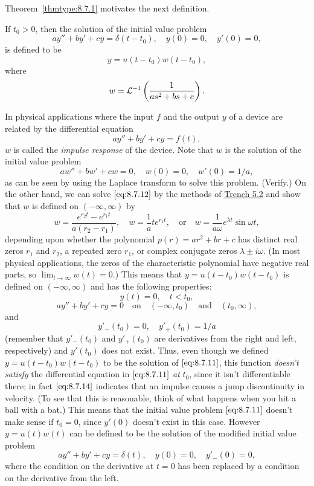 \documentclass{ximera}
\begin{document}
Theorem~\ref{thmtype:8.7.1} motivates the next definition.

\begin{definition}\label{thmtype:8.7.2}
If $t_0>0$, then the solution of the initial value problem
\begin{equation} \label{eq:8.7.11}
ay''+by'+cy=\delta(t-t_0), \quad  y(0)=0,\quad y'(0)=0,
\end{equation}
is defined to be
$$
y=u(t-t_0)w(t-t_0),
$$
where
$$
w={\cal L}^{-1}\left(\frac{1}{as^2+bs+c}\right).
$$
\end{definition}

In physical applications where the input $f$ and the output $y$ of a
device are related by the differential equation
$$
ay''+by'+cy=f(t),
$$
$w$ is called the \textit{impulse response} of the device. Note
that $w$ is the solution of the initial value problem
\begin{equation} \label{eq:8.7.12}
aw''+bw'+cw=0, \quad  w(0)=0,\quad  w'(0)=1/a,
\end{equation}
as can be seen by using the Laplace transform to solve this problem.
(Verify.)
On the other hand, we can solve $\eqref{eq:8.7.12}$ by the methods of
\href{https://xerxes.ximera.org/differentialequations/main/constantCoefficientHomogeneousEquations/constantCoefficientHomogeneousEquations}{Trench 5.2} 
and show that $w$ is defined on
$(-\infty,\infty)$ by
\begin{equation} \label{eq:8.7.13}
w=\frac{e^{r_2t}-e^{r_1t}}{a(r_2-r_1)},\quad
w=\frac{1}{a}te^{r_1t}, \quad\mbox{or}\quad
w=\frac{1}{a\omega}e^{\lambda t}\sin\omega t,
\end{equation}
depending upon whether the polynomial $p(r)=ar^2+br+c$ has distinct
real zeros $r_1$ and $r_2$, a repeated zero $r_1$, or complex
conjugate zeros $\lambda\pm i\omega$. (In most physical applications,
the zeros of the characteristic polynomial have negative real parts,
so $\lim_{t\rightarrow\infty}w(t)=0$.) This means that $y=u(t-t_0)w(t-t_0)$ is
defined on $(-\infty,\infty)$ and has the following properties:
$$
y(t)=0,\quad  t<t_0,
$$
$$
ay''+by'+cy=0\quad\mbox{on}\quad  (-\infty,t_0)\quad\mbox{and}\quad(t_0,\infty),
$$
and
\begin{equation} \label{eq:8.7.14}
y'_-(t_0)=0, \quad   y'_+(t_0)=1/a
\end{equation}
(remember that $y'_-(t_0)$ and $y'_+(t_0)$ are derivatives from the
right and left, respectively) and $y'(t_0)$ does not exist. Thus, even
though we defined $y=u(t-t_0)w(t-t_0)$ to be the solution of
$\eqref{eq:8.7.11}$,  this function \textit{doesn't satisfy}
the differential equation in $\eqref{eq:8.7.11}$ \textit{at} $t_0$, since it
isn't differentiable there;   in fact $\eqref{eq:8.7.14}$ indicates that an
impulse causes a jump discontinuity in velocity. (To see that this is
reasonable, think of what happens when you hit a ball with a bat.)
This means that the initial value problem $\eqref{eq:8.7.11}$ doesn't make
sense if $t_0=0$, since $y'(0)$ doesn't exist in this case. However
$y=u(t)w(t)$ can be defined to be the solution of the modified initial
value problem
$$
ay''+by'+cy=\delta(t), \quad  y(0)=0,\quad y'_-(0)=0,
$$
where the condition on the derivative at $t=0$ has been replaced by a
condition on the derivative from the left.
\end{document}
